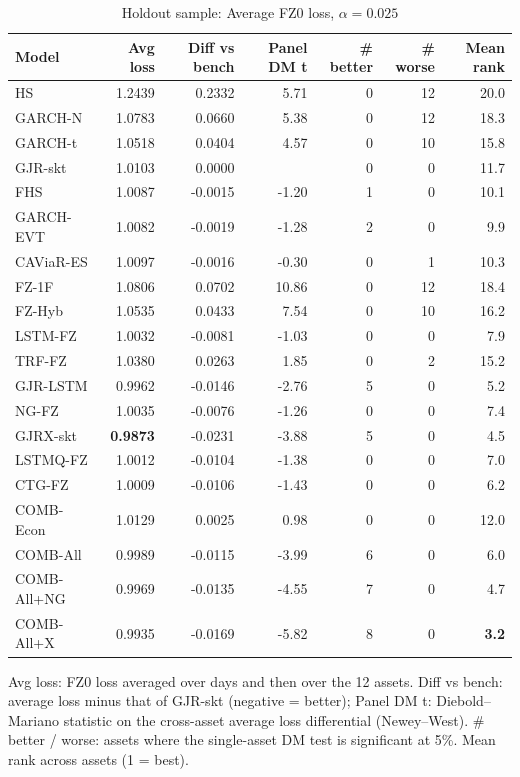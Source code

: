 \begin{table}[htbp]
\centering
\footnotesize
\caption{Holdout sample: Average FZ0 loss, $\alpha=0.025$}
\label{tab:ho_loss_a025}
\begin{tabular}{lrrrrrr}
\toprule
Model & Avg loss & Diff vs bench & Panel DM t & \# better & \# worse & Mean rank \\
\midrule
HS & 1.2439 & 0.2332 & 5.71 & 0 & 12 & 20.0 \\
GARCH-N & 1.0783 & 0.0660 & 5.38 & 0 & 12 & 18.3 \\
GARCH-t & 1.0518 & 0.0404 & 4.57 & 0 & 10 & 15.8 \\
GJR-skt & 1.0103 & 0.0000 &  & 0 & 0 & 11.7 \\
FHS & 1.0087 & -0.0015 & -1.20 & 1 & 0 & 10.1 \\
GARCH-EVT & 1.0082 & -0.0019 & -1.28 & 2 & 0 & 9.9 \\
CAViaR-ES & 1.0097 & -0.0016 & -0.30 & 0 & 1 & 10.3 \\
FZ-1F & 1.0806 & 0.0702 & 10.86 & 0 & 12 & 18.4 \\
FZ-Hyb & 1.0535 & 0.0433 & 7.54 & 0 & 10 & 16.2 \\
LSTM-FZ & 1.0032 & -0.0081 & -1.03 & 0 & 0 & 7.9 \\
TRF-FZ & 1.0380 & 0.0263 & 1.85 & 0 & 2 & 15.2 \\
GJR-LSTM & 0.9962 & -0.0146 & -2.76 & 5 & 0 & 5.2 \\
NG-FZ & 1.0035 & -0.0076 & -1.26 & 0 & 0 & 7.4 \\
GJRX-skt & \textbf{0.9873} & -0.0231 & -3.88 & 5 & 0 & 4.5 \\
LSTMQ-FZ & 1.0012 & -0.0104 & -1.38 & 0 & 0 & 7.0 \\
CTG-FZ & 1.0009 & -0.0106 & -1.43 & 0 & 0 & 6.2 \\
COMB-Econ & 1.0129 & 0.0025 & 0.98 & 0 & 0 & 12.0 \\
COMB-All & 0.9989 & -0.0115 & -3.99 & 6 & 0 & 6.0 \\
COMB-All+NG & 0.9969 & -0.0135 & -4.55 & 7 & 0 & 4.7 \\
COMB-All+X & 0.9935 & -0.0169 & -5.82 & 8 & 0 & \textbf{3.2} \\
\bottomrule
\end{tabular}
\par\smallskip\parbox{\linewidth}{\scriptsize Avg loss: FZ0 loss averaged over days and then over the 12 assets. Diff vs bench: average loss minus that of GJR-skt (negative = better); Panel DM t: Diebold--Mariano statistic on the cross-asset average loss differential (Newey--West). \# better / worse: assets where the single-asset DM test is significant at 5\%. Mean rank across assets (1 = best).}
\end{table}